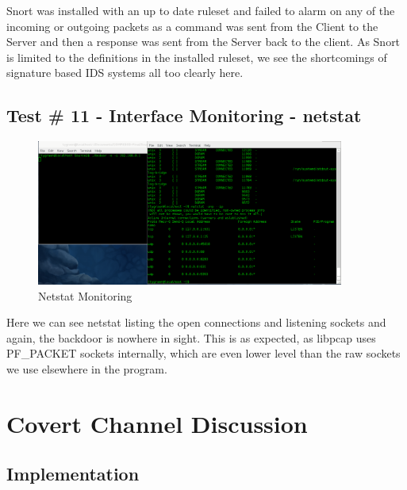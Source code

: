 \documentclass[titlepage]{article}
\begin{document}
Snort was installed with an up to date ruleset and failed to alarm on any of the incoming or outgoing packets as a command was sent from the Client to the Server and then a response was sent from the Server back to the client.  As Snort is limited to the definitions in the installed ruleset, we see the shortcomings of signature based IDS systems all too clearly here.

\clearpage

\subsection{Test \# 11 - Interface Monitoring - netstat}

\begin{figure}[htb]                                                                       
  \begin{center}
    \includegraphics[width=0.9\textwidth]{Pictures/netstat.png}
  \end{center}
  \caption{Netstat Monitoring}
  \label{fig:netstat}
\end{figure}

Here we can see netstat listing the open connections and listening sockets and again, the backdoor is nowhere in sight. This is as expected, as libpcap uses PF\_PACKET sockets internally, which are even lower level than the raw sockets we use elsewhere in the program.

\clearpage

\section{Covert Channel Discussion}

\subsection{Implementation}
\end{document}
